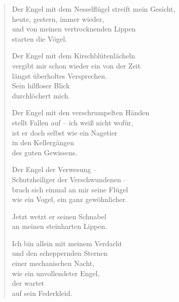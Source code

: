 
\cleartoverso
\let\oldpoemfont=\PoemTitlefont
\renewcommand*{\PoemTitlefont}{\normalfont\Large\itshape}


\begin{verse}

Der Engel mit dem Nesselflügel streift mein Gesicht,\\
heute, gestern, immer wieder,\\
und von meinen vertrocknenden Lippen\\
starten die Vögel.

Der Engel mit dem Kirschblütenlächeln\\
vergibt mir schon wieder ein von der Zeit\\
längst überholtes Versprechen.\\
Sein hilfloser Blick\\
durchlöchert mich.

Der Engel mit den verschrumpelten Händen\\
stellt Fallen auf -- ich weiß nicht wofür,\\
ist er doch selbst wie ein Nagetier\\
in den Kellergängen\\
des guten Gewissens.

Der Engel der Verwesung --\\
Schutzheiliger der Verschwundenen --\\
brach sich einmal an mir seine Flügel\\
wie ein Vogel, ein ganz gewöhnlicher.

Jetzt wetzt er seinen Schnabel\\
an meinen steinharten Lippen.

\clearpage

Ich bin allein mit meinem Verdacht\\
und den scheppernden Sternen\\
einer mechanischen Nacht,\\
wie ein unvollendeter Engel,\\
der wartet\\
auf sein Federkleid.
\end{verse}

\clearpage

\label{carousel}

